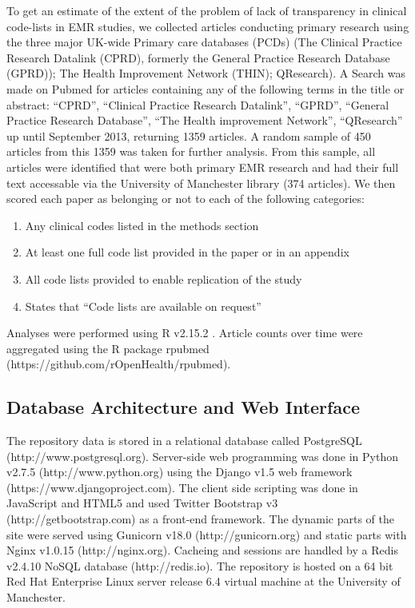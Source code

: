 \documentclass[10pt]{article}
\begin{document}
To get an estimate of the extent of the problem of lack of transparency in clinical code-lists in EMR studies, we collected articles conducting primary research using the three major UK-wide Primary care databases (PCDs) (The Clinical Practice Research Datalink (CPRD), formerly the General Practice Research Database (GPRD)); The Health Improvement Network (THIN); QResearch).  A Search was made on Pubmed for articles containing any of the following terms in the title or abstract: ``CPRD'', ``Clinical Practice Research Datalink'', ``GPRD'', ``General Practice Research Database'', ``The Health improvement Network'', ``QResearch'' up until September 2013, returning 1359 articles.  A random sample of 450 articles from this 1359 was taken for further analysis.  From this sample, all articles were identified that were both primary EMR research and had their full text accessable via the University of Manchester library (374 articles). We then scored each paper as belonging or not to each of the following categories:

\begin{enumerate}
    \item Any clinical codes listed in the methods section
    \item At least one full code list provided in the paper or in an appendix
    \item All code lists provided to enable replication of the study
    \item States that ``Code lists are available on request'' 
\end{enumerate}

Analyses were performed using R v2.15.2 \cite{R2012}. Article counts over time were aggregated using the R package rpubmed (https://github.com\slash rOpenHealth/rpubmed).

\subsection*{Database Architecture and Web Interface}

The repository data is stored in a relational database called PostgreSQL (http://www.postgresql.org). Server-side web programming was done in Python v2.7.5 (http://www.python.org) using the Django v1.5 web framework (https://www.djangoproject.com). The client side scripting was done in JavaScript and HTML5 and used Twitter Bootstrap v3 (http://getbootstrap.com) as a front-end framework.  The dynamic parts of the site were served using Gunicorn v18.0 (http://gunicorn.org) and static parts with Nginx v1.0.15 (http://nginx.org). Cacheing and sessions are handled by a Redis v2.4.10 NoSQL database (http://redis.io). The repository is hosted on a 64 bit Red Hat Enterprise Linux server release 6.4 virtual machine at the University of Manchester. 
\end{document}
